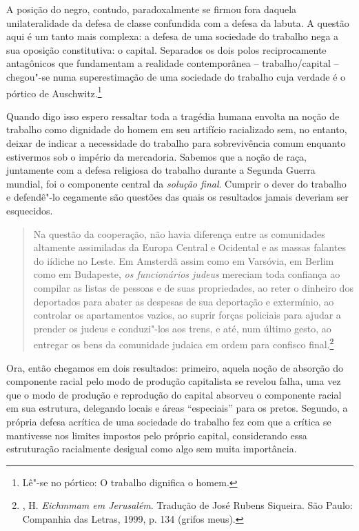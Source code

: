 A posição do negro, contudo, paradoxalmente se firmou fora daquela
unilateralidade da defesa de classe confundida com a defesa da labuta. A
questão aqui é um tanto mais complexa: a defesa de uma sociedade do
trabalho nega a sua oposição constitutiva: o capital. Separados os dois
polos reciprocamente antagônicos que fundamentam a realidade
contemporânea -- trabalho/capital -- chegou"-se numa superestimação de
uma sociedade do trabalho cuja verdade é o pórtico de
Auschwitz.\footnote{Lê"-se no pórtico: O trabalho dignifica o homem.}

Quando digo isso espero ressaltar toda a tragédia humana envolta na
noção de trabalho como dignidade do homem em seu artifício racializado
sem, no entanto, deixar de indicar a necessidade do trabalho para
sobrevivência comum enquanto estivermos sob o império da mercadoria.
Sabemos que a noção de raça, juntamente com a defesa religiosa do
trabalho durante a Segunda Guerra mundial, foi o componente central da
\emph{solução final}. Cumprir o dever do trabalho e defendê"-lo cegamente
são questões das quais os resultados jamais deveriam ser esquecidos.

\begin{quote}
Na questão da cooperação, não havia diferença entre as comunidades
altamente assimiladas da Europa Central e Ocidental e as massas falantes
do iídiche no Leste. Em Amsterdã assim como em Varsóvia, em Berlim como
em Budapeste, \emph{os funcionários judeus} mereciam toda confiança ao
compilar as listas de pessoas e de suas propriedades, ao reter o
dinheiro dos deportados para abater as despesas de sua deportação e
extermínio, ao controlar os apartamentos vazios, ao suprir forças
policiais para ajudar a prender os judeus e conduzi"-los aos trens, e
até, num último gesto, ao entregar os bens da comunidade judaica em
ordem para confisco final.\footnote{, H. \emph{Eichmmam em
  Jerusalém}. Tradução de José Rubens Siqueira. São Paulo: Companhia das
  Letras, 1999, p. 134 (grifos meus).}
\end{quote}

Ora, então chegamos em dois resultados: primeiro, aquela noção de
absorção do componente racial pelo modo de produção capitalista se
revelou falha, uma vez que o modo de produção e reprodução do capital
absorveu o componente racial em sua estrutura, delegando locais e áreas
``especiais'' para os pretos. Segundo, a própria defesa acrítica de uma
sociedade do trabalho fez com que a crítica se mantivesse nos limites
impostos pelo próprio capital, considerando essa estruturação
racialmente desigual como algo sem muita importância.

